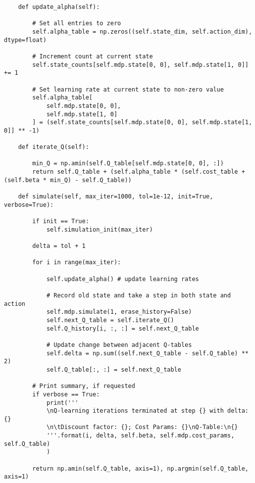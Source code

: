 \documentclass[10pt]{article}
\newcommand{\1}[1]{\mathbbm{1}_{#1}}
\begin{document}
\begin{verbatim}
    def update_alpha(self):
        
        # Set all entries to zero
        self.alpha_table = np.zeros((self.state_dim, self.action_dim), dtype=float)

        # Increment count at current state
        self.state_counts[self.mdp.state[0, 0], self.mdp.state[1, 0]] += 1

        # Set learning rate at current state to non-zero value
        self.alpha_table[
            self.mdp.state[0, 0],
            self.mdp.state[1, 0]
        ] = (self.state_counts[self.mdp.state[0, 0], self.mdp.state[1, 0]] ** -1)

    def iterate_Q(self):

        min_Q = np.amin(self.Q_table[self.mdp.state[0, 0], :])
        return self.Q_table + (self.alpha_table * (self.cost_table + (self.beta * min_Q) - self.Q_table))

    def simulate(self, max_iter=1000, tol=1e-12, init=True, verbose=True):

        if init == True:
            self.simulation_init(max_iter)
        
        delta = tol + 1

        for i in range(max_iter):

            self.update_alpha() # update learning rates

            # Record old state and take a step in both state and action
            self.mdp.simulate(1, erase_history=False) 
            self.next_Q_table = self.iterate_Q()
            self.Q_history[i, :, :] = self.next_Q_table

            # Update change between adjacent Q-tables
            self.delta = np.sum((self.next_Q_table - self.Q_table) ** 2)
            self.Q_table[:, :] = self.next_Q_table

        # Print summary, if requested
        if verbose == True:
            print('''
            \nQ-learning iterations terminated at step {} with delta: {}
            \n\tDiscount factor: {}; Cost Params: {}\nQ-Table:\n{}
            '''.format(i, delta, self.beta, self.mdp.cost_params, self.Q_table)
            )

        return np.amin(self.Q_table, axis=1), np.argmin(self.Q_table, axis=1)
    \end{verbatim}
\end{document}
